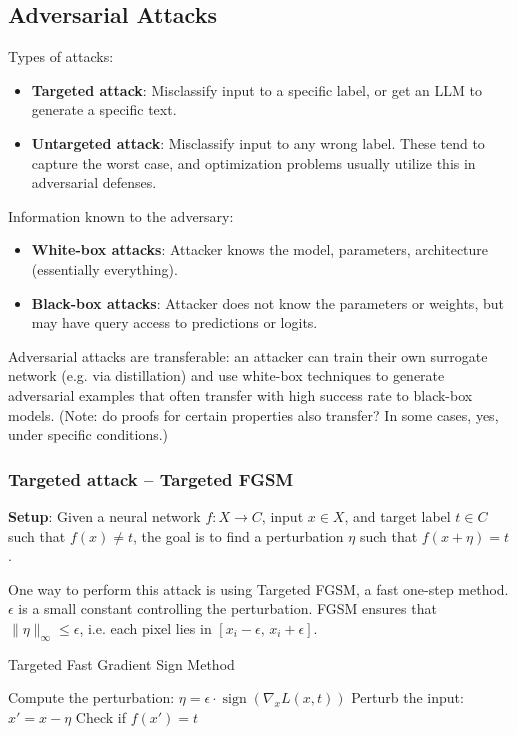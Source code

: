 \documentclass[11pt]{article}
\begin{document}
\subsection{Adversarial Attacks}
Types of attacks:
\begin{itemize}
	\item \textbf{Targeted attack}: Misclassify input to a specific label, or get an LLM to generate a specific text. 
	\item \textbf{Untargeted attack}: Misclassify input to any wrong label. These tend to capture the worst case, and optimization problems usually utilize this in adversarial defenses.
\end{itemize}

Information known to the adversary:
\begin{itemize}
	\item \textbf{White-box attacks}: Attacker knows the model, parameters, architecture (essentially everything).
	\item \textbf{Black-box attacks}: Attacker does not know the parameters or weights, but may have query access to predictions or logits.  
\end{itemize}
Adversarial attacks are transferable: an attacker can train their own surrogate network (e.g. via distillation) and use white-box techniques to generate adversarial examples that often transfer with high success rate to black-box models. (Note: do proofs for certain properties also transfer? In some cases, yes, under specific conditions.)

\subsubsection{Targeted attack – Targeted FGSM}
\textbf{Setup}: Given a neural network $f: X \to C$, input $x \in X$, and target label $t \in C$ such that $f(x) \neq t$, the goal is to find a perturbation $\eta$ such that $f(x + \eta) = t$.

One way to perform this attack is using Targeted FGSM, a fast one-step method. $\epsilon$ is a small constant controlling the perturbation. FGSM ensures that $\| \eta \|_\infty \leq \epsilon$, i.e. each pixel lies in $[x_i - \epsilon,\, x_i + \epsilon]$.

\begin{algorithm}
\caption{Targeted Fast Gradient Sign Method}
\begin{algorithmic}[1]
\State Compute the perturbation: $\eta = \epsilon \cdot \operatorname{sign}(\nabla_x L(x, t))$
\State Perturb the input: $x' = x - \eta$
\State Check if $f(x') = t$ 
\end{algorithmic}
\end{algorithm}
\end{document}
